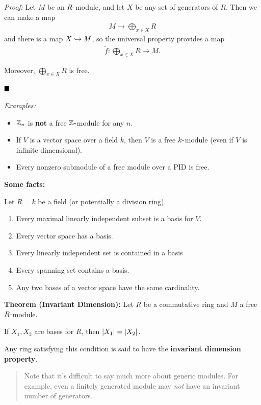 \emph{Proof:} Let \(M\) be an \(R{\hbox{-}}\)module, and let \(X\) be any set
of generators of \(R\). Then we can make a map
\begin{align*}
M \to \bigoplus_{x\in X} R
\end{align*} and there is a map \(X \hookrightarrow M\), so the universal
property provides a map
\begin{align*}
\tilde f: \bigoplus_{x\in X} R \to M
.\end{align*}

Moreover, \(\bigoplus_{x\in X} R\) is free.

\(\qed\)

\emph{Examples:}

\begin{itemize}
\item
  \({\mathbb{Z}}_n\) is \textbf{not} a free \({\mathbb{Z}}{\hbox{-}}\)module for any \(n\).
\item
  If \(V\) is a vector space over a field \(k\), then \(V\) is a free
  \(k{\hbox{-}}\)module (even if \(V\) is infinite dimensional).
\item
  Every nonzero submodule of a free module over a PID is free.
\end{itemize}

\textbf{Some facts:}

Let \(R = k\) be a field (or potentially a division ring).

\begin{enumerate}
\def\labelenumi{\arabic{enumi}.}
\item
  Every maximal linearly independent subset is a basis for \(V\).
\item
  Every vector space has a basis.
\item
  Every linearly independent set is contained in a basis
\item
  Every spanning set contains a basis.
\item
  Any two bases of a vector space have the same cardinality.
\end{enumerate}

\textbf{Theorem (Invariant Dimension):} Let \(R\) be a commutative ring
and \(M\) a free \(R{\hbox{-}}\)module.

If \(X_1, X_2\) are bases for \(R\), then \({\left\lvert {X_1} \right\rvert} = {\left\lvert {X_2} \right\rvert}\).

Any ring satisfying this condition is said to have the \textbf{invariant
dimension property}.

\begin{quote}
Note that it's difficult to say much more about generic modules. For
example, even a finitely generated module may \emph{not} have an
invariant number of generators.
\end{quote}


